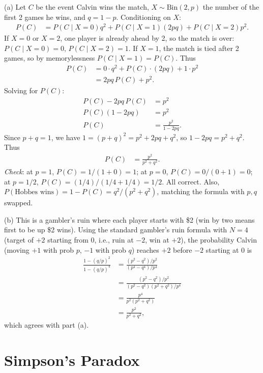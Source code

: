 \documentclass[11pt]{article}
\begin{document}
(a) Let $C$ be the event Calvin wins the match, $X \sim \text{Bin}(2,p)$ the number of the first 2 games he wins, and $q=1-p$. Conditioning on $X$:
\begin{align*}
P(C) &= P(C\mid X=0)q^2 + P(C\mid X=1)(2pq) + P(C\mid X=2)p^2.
\end{align*}
If $X=0$ or $X=2$, one player is already ahead by 2, so the match is over: $P(C\mid X=0)=0$, $P(C\mid X=2)=1$. If $X=1$, the match is tied after 2 games, so by memorylessness $P(C\mid X=1) = P(C)$. Thus
\begin{align*}
P(C) &= 0\cdot q^2 + P(C)\cdot(2pq) + 1\cdot p^2 \\
&= 2pq\,P(C) + p^2.
\end{align*}
Solving for $P(C)$:
\begin{align*}
P(C) - 2pq\,P(C) &= p^2 \\
P(C)(1-2pq) &= p^2 \\
P(C) &= \frac{p^2}{1-2pq}.
\end{align*}
Since $p+q=1$, we have $1 = (p+q)^2 = p^2+2pq+q^2$, so $1-2pq = p^2+q^2$. Thus
\begin{align*}
P(C) &= \frac{p^2}{p^2+q^2}.
\end{align*}
\textit{Check}: at $p=1$, $P(C) = 1/(1+0)=1$; at $p=0$, $P(C)=0/(0+1)=0$; at $p=1/2$, $P(C) = (1/4)/(1/4+1/4) = 1/2$. All correct. Also, $P(\text{Hobbes wins}) = 1-P(C) = q^2/(p^2+q^2)$, matching the formula with $p,q$ swapped.

(b) This is a gambler's ruin where each player starts with \$2 (win by two means first to be up \$2 wins). Using the standard gambler's ruin formula with $N=4$ (target of $+2$ starting from $0$, i.e., ruin at $-2$, win at $+2$), the probability Calvin (moving $+1$ with prob $p$, $-1$ with prob $q$) reaches $+2$ before $-2$ starting at $0$ is
\begin{align*}
\frac{1-(q/p)^2}{1-(q/p)^4} &= \frac{(p^2-q^2)/p^2}{(p^4-q^4)/p^4} \\
&= \frac{(p^2-q^2)/p^2}{(p^2-q^2)(p^2+q^2)/p^4} \\
&= \frac{p^4}{p^2(p^2+q^2)} \\
&= \frac{p^2}{p^2+q^2},
\end{align*}
which agrees with part (a).

\section{Simpson's Paradox}
\end{document}
